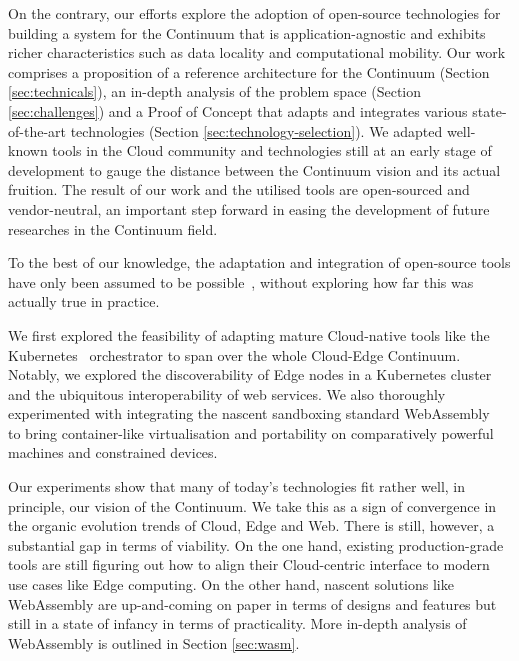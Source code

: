On the contrary, our efforts explore the adoption of open-source technologies for building a system for the Continuum that is application-agnostic and exhibits richer characteristics such as data locality and computational mobility. Our work comprises a proposition of a reference architecture for the Continuum (Section \ref{sec:technicals}), an in-depth analysis of the problem space (Section \ref{sec:challenges}) and a  Proof of Concept that adapts and integrates various state-of-the-art technologies (Section \ref{sec:technology-selection}). We adapted well-known tools in the Cloud community and technologies still at an early stage of development to gauge the distance between the Continuum vision and its actual fruition. The result of our work and the utilised tools are open-sourced and vendor-neutral, an important step forward in easing the development of future researches in the Continuum field.

To the best of our knowledge, the adaptation and integration of open-source tools have only been assumed to be possible~\cite{menetrey2022webassembly}, without exploring how far this was actually true in practice. 

We first explored the feasibility of adapting mature Cloud-native tools like the Kubernetes~\cite{kubernetes} orchestrator to span over the whole Cloud-Edge Continuum. Notably, we explored the discoverability of Edge nodes in a Kubernetes cluster and the ubiquitous interoperability of web services. We also thoroughly experimented with integrating the nascent sandboxing standard WebAssembly~\cite{haas2017bringing} to bring container-like virtualisation and portability on comparatively powerful machines and constrained devices. 

Our experiments show that many of today's technologies fit rather well, in principle, our vision of the Continuum. We take this as a sign of convergence in the organic evolution trends of Cloud, Edge and Web. There is still, however, a substantial gap in terms of viability. On the one hand, existing production-grade tools are still figuring out how to align their Cloud-centric interface to modern use cases like Edge computing. On the other hand, nascent solutions like WebAssembly are up-and-coming on paper in terms of designs and features but still in a state of infancy in terms of practicality. More in-depth analysis of WebAssembly is outlined in Section \ref{sec:wasm}.


